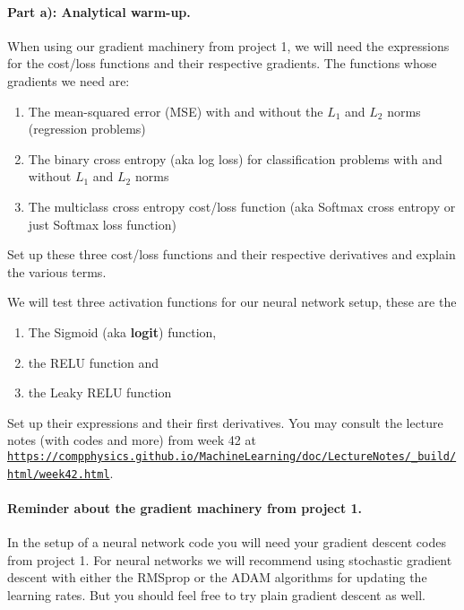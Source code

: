 \documentclass[%
oneside,                 %
final,                   %
10pt]{article}
\begin{document}
\paragraph{Part a): Analytical warm-up.}
When using our gradient machinery from project 1, we will need the expressions for the cost/loss functions and their respective
gradients. The functions whose gradients we need are:
\begin{enumerate}
\item The mean-squared error (MSE) with and without the $L_1$ and $L_2$ norms (regression problems)

\item The binary cross entropy (aka log loss)  for classification problems with and without $L_1$ and $L_2$ norms

\item The multiclass cross entropy cost/loss function (aka Softmax cross entropy or just Softmax loss function)
\end{enumerate}

\noindent
Set up these three cost/loss functions and their respective derivatives and explain the various terms.

We will test three activation functions for our neural network setup, these are the 
\begin{enumerate}
\item The Sigmoid (aka \textbf{logit}) function,

\item the RELU function and

\item the Leaky RELU function
\end{enumerate}

\noindent
Set up their expressions and their first derivatives.
You may consult the lecture notes (with codes and more) from week 42 at \href{{https://compphysics.github.io/MachineLearning/doc/LectureNotes/_build/html/week42.html}}{\nolinkurl{https://compphysics.github.io/MachineLearning/doc/LectureNotes/_build/html/week42.html}}.

\paragraph{Reminder about the gradient machinery from project 1.}
In the setup of a neural network code you will need your gradient descent codes from
project 1.  For neural networks we will recommend using stochastic
gradient descent with either the RMSprop or the ADAM algorithms for
updating the learning rates. But you should feel free to try plain gradient descent as well.
\end{document}
